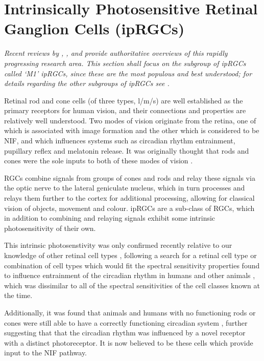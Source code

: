 \section{Intrinsically Photosensitive Retinal Ganglion Cells (ipRGCs)}

\textit{Recent reviews by \citet{spitschan_melanopsin_2019}, \citet{do_melanopsin_2019},\citet{graham_melanopsin-expressing_2016} and \citet{lucas_melanopsin_2015} provide authoritative overviews of this rapidly progressing research area. This section shall focus on the subgroup of \glspl{ipRGC} called `M1' \glspl{ipRGC}, since these are the most populous and best understood; for details regarding the other subgroups of \glspl{ipRGC} see \citet{ecker_melanopsin-expressing_2010}.}

\bigskip

Retinal rod and cone cells (of three types, l/m/s) are well established as the primary receptors for human vision, and their connections and properties are relatively well understood. Two modes of vision originate from the retina, one of which is associated with image formation and the other which is considered to be \gls{NIF}, and which influences systems such as circadian rhythm entrainment, pupillary reflex and melatonin release. It was originally thought that rods and cones were the sole inputs to both of these modes of vision \citep{hankins_melanopsin_2008}.

\Glspl{RGC} combine signals from groups of cones and rods and relay these signals via the optic nerve to the lateral geniculate nucleus, which in turn processes and relays them further to the cortex for additional processing, allowing for classical vision of objects, movement and colour. \Glspl{ipRGC} are a sub-class of \glspl{RGC}, which in addition to combining and relaying signals exhibit some intrinsic photosensitivity of their own. 

This intrinsic photosenstivity was only confirmed recently relative to our knowledge of other retinal cell types \citep{qiu_induction_2005}, following a search for a retinal cell type or combination of cell types which would fit the spectral sensitivity properties found to influence entrainment of the circadian rhythm in humans and other animals \citep{brainard_human_2001,brainard_action_2001}, which was dissimilar to all of the spectral sensitivities of the cell classes known at the time.

Additionally, it was found that animals and humans with no functioning rods or cones were still able to have a correctly functioning circadian system \citep{freedman_regulation_1999,zaidi_short-wavelength_2007}, further suggesting that that the circadian rhythm was influenced by a novel receptor with a distinct photoreceptor. It is now believed to be these cells which provide input to the \gls{NIF} pathway.

